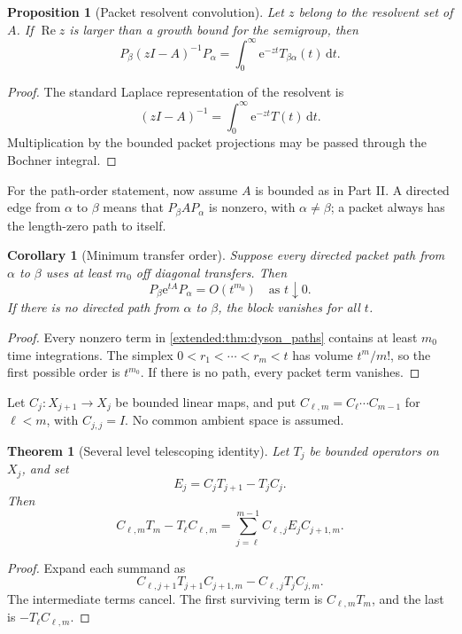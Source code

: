\documentclass[11pt,letterpaper]{article}
\newtheorem{theorem}{Theorem}[section]
\theoremstyle{plain}
\newtheorem{proposition}[proposition]{Proposition}
\theoremstyle{plain}
\theoremstyle{plain}
\newtheorem{corollary}[corollary]{Corollary}
\theoremstyle{definition}
\theoremstyle{definition}
\theoremstyle{definition}
\theoremstyle{definition}
\theoremstyle{definition}
\theoremstyle{remark}
\theoremstyle{remark}
\theoremstyle{remark}
\theoremstyle{remark}
\theoremstyle{remark}
\theoremstyle{remark}
\newcommand{\e}{\mathrm e}
\newcommand{\dd}{\,\mathrm d}
\let\KomorebiPrimitivemathrm\mathrm
\renewcommand{\mathrm}[1]{{\KomorebiPrimitivemathrm{#1}}}
\begin{document}
\begin{proposition}[Packet resolvent convolution]\label{earlier:record:002}\label{earlier:prop:packet_resolvent}
Let \(z\) belong to the resolvent set of \(A\). If \(\operatorname{Re}z\) is larger than a growth bound for the semigroup, then
\[
P_\beta(zI-A)^{-1}P_\alpha
=
\int_0^{\infty}\e^{-zt}T_{\beta\alpha}(t)\dd t.
\]
\end{proposition}

\begin{proof}
The standard Laplace representation of the resolvent is
\[
(zI-A)^{-1}
=
\int_0^{\infty}\e^{-zt}T(t)\dd t.
\]
Multiplication by the bounded packet projections may be passed through the Bochner integral.
\end{proof}


For the path-order statement, now assume $A$ is bounded as in Part II. A directed edge from $\alpha$ to $\beta$ means that $P_\beta A P_\alpha$ is nonzero, with $\alpha\ne\beta$; a packet always has the length-zero path to itself.
\begin{corollary}[Minimum transfer order]\label{earlier:record:003}\label{earlier:cor:minimum_transfer_order}
Suppose every directed packet path from \(\alpha\) to \(\beta\) uses at least \(m_0\) off diagonal transfers. Then
\[
P_\beta\e^{tA}P_\alpha
=O(t^{m_0})
\quad\text{as }t\downarrow0.
\]
If there is no directed path from \(\alpha\) to \(\beta\), the block vanishes for all \(t\).
\end{corollary}

\begin{proof}
Every nonzero term in \cref{extended:thm:dyson_paths} contains at least \(m_0\) time integrations. The simplex \(0<r_1<\cdots<r_m<t\) has volume \(t^m/m!\), so the first possible order is \(t^{m_0}\). If there is no path, every packet term vanishes.
\end{proof}


Let $C_j:X_{j+1}\to X_j$ be bounded linear maps, and put $C_{\ell,m}=C_\ell\cdots C_{m-1}$ for $\ell<m$, with $C_{j,j}=I$. No common ambient space is assumed.
\begin{theorem}[Several level telescoping identity]\label{earlier:record:004}\label{earlier:thm:multilevel_telescoping}
Let \(T_j\) be bounded operators on \(X_j\), and set
\[
E_j=C_jT_{j+1}-T_jC_j.
\]
Then
\[
\boxed{
C_{\ell,m}T_m-T_\ell C_{\ell,m}
=
\sum_{j=\ell}^{m-1}
C_{\ell,j}E_jC_{j+1,m}.
}
\]
\end{theorem}

\begin{proof}
Expand each summand as
\[
C_{\ell,j+1}T_{j+1}C_{j+1,m}
-
C_{\ell,j}T_jC_{j,m}.
\]
The intermediate terms cancel. The first surviving term is \(C_{\ell,m}T_m\), and the last is \(-T_\ell C_{\ell,m}\).
\end{proof}
\end{document}
